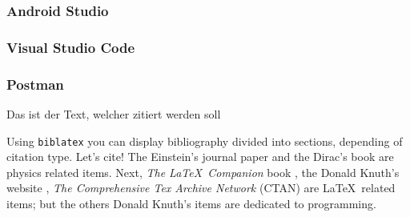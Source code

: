 \subsubsection{Android Studio}

\subsubsection{Visual Studio Code}

\subsubsection{Postman}


Das ist der Text, welcher zitiert werden soll \autocite[399]{einstein}

Using \texttt{biblatex} you can display bibliography divided into sections, 
depending of citation type. 
Let's cite! The Einstein's journal paper \autocite{einstein} and the Dirac's 
book \autocite{dirac} are physics related items. 
Next, \textit{The \LaTeX\ Companion} book \autocite{latexcompanion}, the Donald 
Knuth's website \autocite{knuthwebsite}, \textit{The Comprehensive Tex Archive 
Network} (CTAN) \autocite{ctan} are \LaTeX\ related items; but the others Donald 
Knuth's items \autocite{knuth-fa,knuth-acp} are dedicated to programming.

